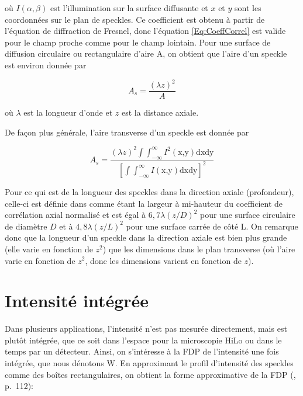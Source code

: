 \documentclass{article}       %
\begin{document}
où $I(\alpha, \beta)$ est l'illumination sur la surface diffusante et $x$ et $y$ sont les coordonnées sur le plan de speckles. Ce coefficient est obtenu à partir de l'équation de diffraction de Fresnel, donc l'équation \ref{Eq:CoeffCorrel} est valide pour le champ proche comme pour le champ lointain. Pour une surface de diffusion circulaire ou rectangulaire d'aire A, on obtient que l'aire d'un speckle est environ donnée par

\begin{equation*}
    A_{s} = \frac{(\lambda z)^2}{A}
\end{equation*}

où $\lambda$ est la longueur d'onde et $z$ est la distance axiale.

De façon plus générale, l'aire transverse d'un speckle est donnée par

\begin{equation*}
    A_{s} = \frac{(\lambda z)^{2}\int\int_{-\infty}^{\infty}I^{2}(\text{x,y})\text{dxdy}}{\left[\int\int_{-\infty}^{\infty}I(\text{x,y})\text{dxdy}\right]^2}
\end{equation*}

Pour ce qui est de la longueur des speckles dans la direction axiale (profondeur), celle-ci est définie dans \cite{Manuel} comme étant la largeur à mi-hauteur du coefficient de corrélation axial normalisé et est égal à $6,7\lambda(z/D)^2$ pour une surface circulaire de diamètre $D$ et à $4,8\lambda(z/L)^2$ pour une surface carrée de côté L. On remarque donc que la longueur d'un speckle dans la direction axiale est bien plus grande (elle varie en fonction de $z^2$) que les dimensions dans le plan transverse (où l'aire varie en fonction de $z^2$, donc les dimensions varient en fonction de $z$).\\

\bigskip

\section{Intensité intégrée}

Dans plusieurs applications, l'intensité n'est pas mesurée directement, mais est plutôt intégrée, que ce soit dans l'espace pour la microscopie HiLo ou dans le temps par un détecteur. Ainsi, on s'intéresse à la FDP de l'intensité une fois intégrée, que nous dénotons W. En approximant le profil d'intensité des speckles comme des boîtes rectangulaires, on obtient la forme approximative de la FDP (\cite{Manuel}, p.~112):
\end{document}
